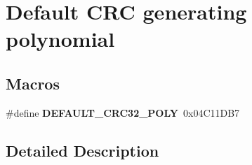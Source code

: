 \hypertarget{group___c_r_c___default___polynomial___value}{}\section{Default C\+RC generating polynomial}
\label{group___c_r_c___default___polynomial___value}
\subsection*{Macros}
\begin{DoxyCompactItemize}
\item 
\mbox{\label{group___c_r_c___default___polynomial___value_ga57e0396208abe9a8ca984156043a6bbb}} 
\#define {\bfseries D\+E\+F\+A\+U\+L\+T\+\_\+\+C\+R\+C32\+\_\+\+P\+O\+LY}~0x04\+C11\+D\+B7
\end{DoxyCompactItemize}


\subsection{Detailed Description}
